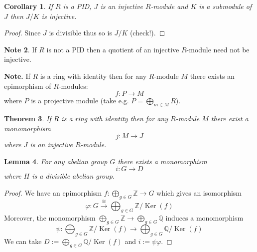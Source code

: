 \documentclass[12pt, letterpaper, oneside]{article}
\theoremstyle{plain}
\newtheorem{theorem}{Theorem}[section]
\newtheorem{lemma}[theorem]{Lemma}
\newtheorem{corollary}[theorem]{Corollary}
\theoremstyle{definition}
\newtheorem{note}[theorem]{Note}
\newcommand{\lra}{\longrightarrow}
\newcommand{\Z}{{\mathbb Z}}
\newcommand{\Q}{{\mathbb Q}}
\newcommand{\Ker}{\operatorname{Ker}}
\newcommand{\vs}{\vskip 5mm}
\begin{document}
\vs\vs

\begin{corollary}
If $R$ is a PID, $J$ is an injective $R$-module and $K$ is a submodule of $J$ then
$J/K$ is injective.
\end{corollary}

\vs

\begin{proof}
Since $J$ is divisible thus so is $J/K$ (check!).
\end{proof}

\vs\vs

\begin{note}
If $R$ is not a PID then  a quotient of an injective $R$-module  need not be injective. 
\end{note}



\vs\vs


\textbf{Note.} If $R$ is a ring with identity then for any $R$-module $M$ 
there exists an epimorphism of $R$-modules:
$$f\colon P \lra  M$$
where $P$ is a projective module (take e.g. $P = \bigoplus_{m\in M} R$). 



\vs\vs

\begin{theorem}
\label{THM_EMBEDINTOINJECT}
If $R$ is a ring with identity then for any  $R$-module $M$ there exist a monomorphism 
$$j\colon M \lra J$$
where $J$ is an injective $R$-module.  
\end{theorem}


\vs\vs

\begin{lemma}
\label{LEMMA_EMBEDABGPINTODIVIS}
For any abelian group $G$ there exists a monomorphism 
$$i\colon G \lra D$$
where $H$ is a divisible abelian group. 
\end{lemma}


\vs\vs

\begin{proof}
We have an epimorphism $f\colon \bigoplus_{g\in G}\Z \to G$
which gives an isomorphism 
$$ \varphi\colon G\overset{\cong}{\lra} \bigoplus_{g\in G}\Z/\Ker(f)$$
Moreover, the monomorphism $\bigoplus_{g\in G} \Z \to \bigoplus_{g\in G}\Q$ induces 
a monomorphism 
$$\psi\colon \bigoplus_{g\in G}\Z/\Ker(f) \lra \bigoplus_{g\in G}\Q/\Ker(f)$$
We can take  $D := \bigoplus_{g\in G}\Q/\Ker(f)$ and $i:= \psi\varphi$.
\end{proof}



\vs\vs
\end{document}
